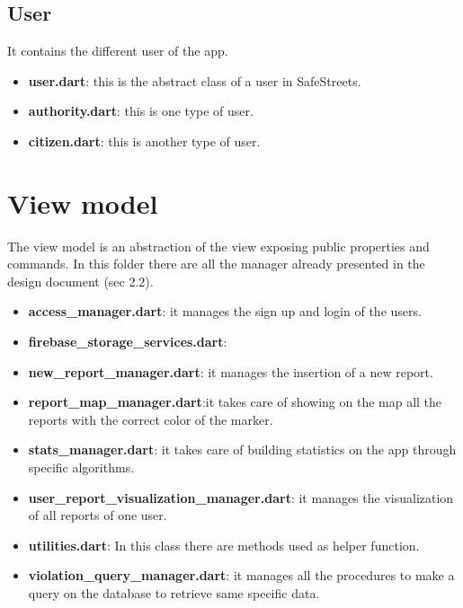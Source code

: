 \documentclass[../ITD.tex]{subfiles}
\begin{document}
    \subsection{User}\label{subsec:user}
    It contains the different user of the app.
    \begin{itemize}
        \item \textbf{user.dart}: this is the abstract class of a user in SafeStreets.
        \item \textbf{authority.dart}: this is one type of user.
        \item \textbf{citizen.dart}: this is another type of user.
    \end{itemize}
    \section{View model}\label{sec:view-model}
    The view model is an abstraction of the view exposing public properties and commands.
    In this folder there are all the manager already presented in the design document (sec 2.2).
    \begin{itemize}
        \item \textbf{access\_manager.dart}: it manages the sign up and login of the users.
        \item \textbf{firebase\_storage\_services.dart}:%
        \item \textbf{new\_report\_manager.dart}: it manages the insertion of a new report.
        \item \textbf{report\_map\_manager.dart}:it takes care of showing on the map all the reports with the correct color of the marker.
        \item \textbf{stats\_manager.dart}: it takes care of building statistics on the app through specific algorithms.
        \item \textbf{user\_report\_visualization\_manager.dart}: it manages the visualization of all reports of one user.
        \item \textbf{utilities.dart}: In this class there are methods used as helper function.
        \item \textbf{violation\_query\_manager.dart}: it manages all the procedures to make a query on the database to retrieve same specific data.
    \end{itemize}
\end{document}
